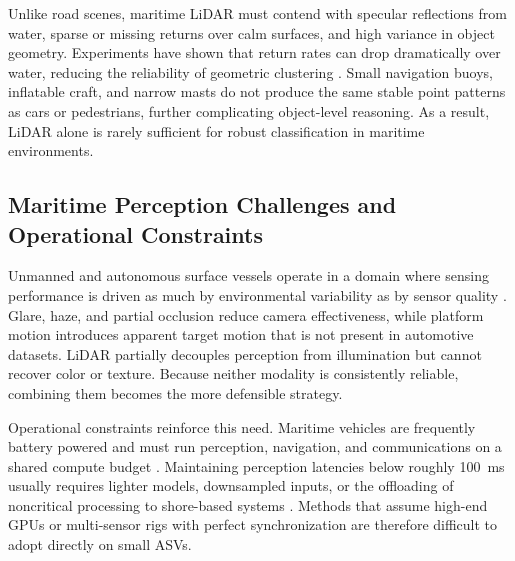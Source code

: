 \documentclass[../main.tex]{subfiles}
\begin{document}
Unlike road scenes, maritime LiDAR must contend with specular reflections from water, sparse or missing returns over calm surfaces, and high variance in object geometry. Experiments have shown that return rates can drop dramatically over water, reducing the reliability of geometric clustering \cite{halterman2015, yeong2021}. Small navigation buoys, inflatable craft, and narrow masts do not produce the same stable point patterns as cars or pedestrians, further complicating object-level reasoning. As a result, LiDAR alone is rarely sufficient for robust classification in maritime environments.

\subsection{Maritime Perception Challenges and Operational Constraints}
Unmanned and autonomous surface vessels operate in a domain where sensing performance is driven as much by environmental variability as by sensor quality \cite{bai2022, yeong2021}. Glare, haze, and partial occlusion reduce camera effectiveness, while platform motion introduces apparent target motion that is not present in automotive datasets. LiDAR partially decouples perception from illumination but cannot recover color or texture. Because neither modality is consistently reliable, combining them becomes the more defensible strategy.

Operational constraints reinforce this need. Maritime vehicles are frequently battery powered and must run perception, navigation, and communications on a shared compute budget \cite{zotero-item-1911, huang}. Maintaining perception latencies below roughly 100~ms usually requires lighter models, downsampled inputs, or the offloading of noncritical processing to shore-based systems \cite{liang2022}. Methods that assume high-end GPUs or multi-sensor rigs with perfect synchronization are therefore difficult to adopt directly on small ASVs.
\end{document}
